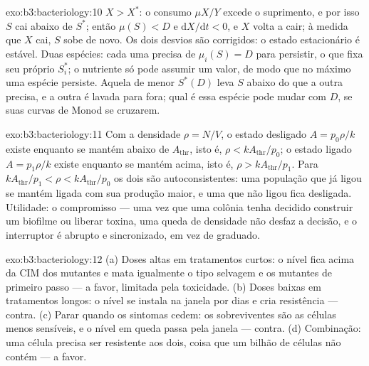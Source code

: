 \begin{solution}{exo:b3:bacteriology:10}
$X > X^{*}$: o consumo $\mu X/Y$ excede o suprimento, e por isso $S$
cai abaixo de $S^{*}$; então $\mu(S) < D$ e
$\mathrm{d}X/\mathrm{d}t < 0$, e $X$ volta a cair; à medida que $X$
cai, $S$ sobe de novo. Os dois desvios são corrigidos: o estado
estacionário é estável. Duas espécies: cada uma precisa de
$\mu_{i}(S) = D$ para persistir, o que fixa seu próprio $S_{i}^{*}$; o
nutriente só pode assumir um valor, de modo que no máximo uma espécie
persiste. Aquela de menor $S^{*}(D)$ leva $S$ abaixo do que a outra
precisa, e a outra é lavada para fora; qual é essa espécie pode mudar
com $D$, se suas curvas de Monod se cruzarem.
\end{solution}

\begin{solution}{exo:b3:bacteriology:11}
Com a densidade $\rho = N/V$, o estado desligado $A = p_{0}\rho/k$
existe enquanto se mantém abaixo de $A_{\text{thr}}$, isto é,
$\rho < kA_{\text{thr}}/p_{0}$; o estado ligado $A = p_{1}\rho/k$
existe enquanto se mantém acima, isto é, $\rho
> kA_{\text{thr}}/p_{1}$.
Para $kA_{\text{thr}}/p_{1} < \rho <
kA_{\text{thr}}/p_{0}$ os dois são
autoconsistentes: uma população que já ligou se mantém ligada com sua
produção maior, e uma que não ligou fica desligada. Utilidade: o
compromisso --- uma vez que uma colônia tenha decidido construir um
biofilme ou liberar toxina, uma queda de densidade não desfaz a
decisão, e o interruptor é abrupto e sincronizado, em vez de graduado.
\end{solution}

\begin{solution}{exo:b3:bacteriology:12}
(a) Doses altas em tratamentos curtos: o nível fica acima da CIM dos
mutantes e mata igualmente o tipo selvagem e os mutantes de primeiro
passo --- a favor, limitada pela toxicidade. (b) Doses baixas em
tratamentos longos: o nível se instala na janela por dias e cria
resistência --- contra. (c) Parar quando os sintomas cedem: os
sobreviventes são as células menos sensíveis, e o nível em queda passa
pela janela --- contra. (d) Combinação: uma célula precisa ser
resistente aos dois, coisa que um bilhão de células não contém --- a
favor.
\end{solution}

